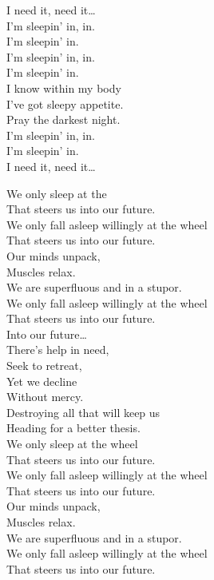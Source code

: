 I need it, need it… \\

I'm sleepin' in, in. \\
I'm sleepin' in. \\
I'm sleepin' in, in. \\
I'm sleepin' in. \\

I know within my body \\
I've got sleepy appetite. \\
Pray the darkest night. \\
I'm sleepin' in, in. \\
I'm sleepin' in. \\

I need it, need it… \\





We only sleep at the  \\
That steers us into our future. \\
We only fall asleep willingly at the wheel \\
That steers us into our future. \\
Our minds unpack, \\
Muscles relax. \\
We are superfluous and in a stupor. \\
We only fall asleep willingly at the wheel \\
That steers us into our future. \\

Into our future… \\

There's help in need, \\
Seek to retreat, \\
Yet we decline \\
Without mercy. \\
Destroying all that will keep us \\
Heading for a better thesis. \\

We only sleep at the wheel \\
That steers us into our future. \\
We only fall asleep willingly at the wheel \\
That steers us into our future. \\
Our minds unpack, \\
Muscles relax. \\
We are superfluous and in a stupor. \\
We only fall asleep willingly at the wheel \\
That steers us into our future. \\

